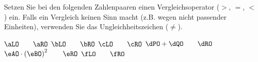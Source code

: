 Setzen Sie bei den folgenden Zahlenpaaren einen Vergleichsoperator ($>$, $=$, $<$) ein. Falls ein Vergleich keinen Sinn macht (z.B. wegen nicht passender Einheiten), verwenden Sie das Ungleichheitszeichen ($\neq$).

\begin{abcliste}
\abc $\aLO \qquad \aRO$
\abc $\bLO \qquad \bRO$
\abc $\cLO \qquad \cRO$
\abc $\dPO + \dQO \qquad \dRO$
\abc $\eAO\cdot\left(\eBO\right)^2 \qquad \eRO$
\abc $\fLO \qquad \fRO$
\end{abcliste}
